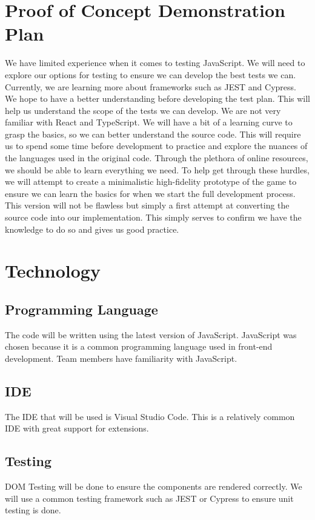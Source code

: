 \documentclass{article}
\begin{document}
	\section{Proof of Concept Demonstration Plan}
	We have limited experience when it comes to testing JavaScript. We will
	need to explore our options for testing to ensure we can develop the best
	tests we can. Currently, we are learning more about frameworks such as JEST
	and Cypress. We hope to have a better understanding before developing the
	test plan. This will help us understand the scope of the tests we can
	develop. We are not very familiar with React and TypeScript. We will have a
	bit of a learning curve to grasp the basics, so we can better understand
	the source code. This will require us to spend some time before development
	to practice and explore the nuances of the languages used in the original
	code. Through the plethora of online resources, we should be able to learn
	everything we need. To help get through these hurdles, we will attempt to
	create a minimalistic high-fidelity prototype of the game to ensure we can
	learn the basics for when we start the full development process. This
	version will not be flawless but simply a first attempt at converting the
	source code into our implementation. This simply serves to confirm we
	have the knowledge to do so and gives us good practice.
	
	\section{Technology}
	\subsection{Programming Language}
	The code will be written using the latest version of JavaScript. JavaScript 
	was 
	chosen because it is a common programming language used in front-end 
	development. Team members have familiarity with JavaScript.
	\subsection{IDE}
	The IDE that will be used is Visual Studio Code. This is a relatively 
	common 
	IDE with great support for extensions.
	\subsection{Testing}
	DOM Testing will be done to ensure the components are rendered correctly. 
	We 
	will use a common testing framework such as JEST or Cypress to ensure unit 
	testing is done.
\end{document}
